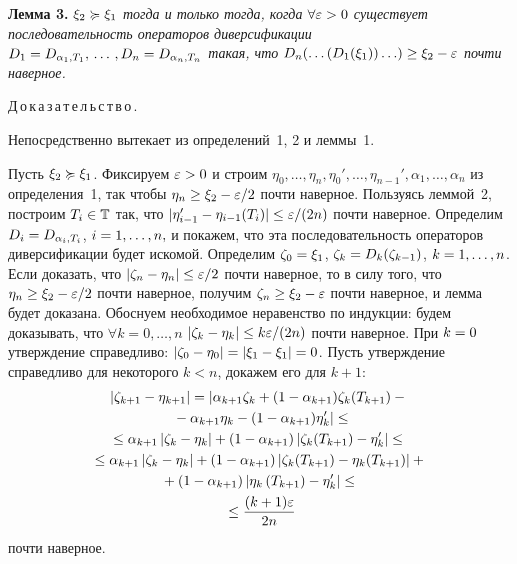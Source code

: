 \begin{multicols}{2}
\medskip

\noindent
\textbf{Лемма 3.} \textit{$\xi_2 \succcurlyeq \xi_1$ тогда и только тогда, когда $
\forall \eps\hm>0 $ существует последовательность операторов
диверсификации $ D_1=D_{\alpha_1,T_1},\, \ldots\, ,
D_n\hm=D_{\alpha_n,T_n} $ такая, что $ D_n(\ldots(D_1(\xi_1))\ldots)
\ge \xi_2 \hm- \eps $ почти наверное.}

\medskip

\noindent
Д\,о\,к\,а\,з\,а\,т\,е\,л\,ь\,с\,т\,в\,о\,.\

\noindent
\fbox{$\Leftarrow$} Непосредственно вытекает из определений~1, 2 и леммы~1.

\noindent
\fbox{$\Rightarrow$} Пусть $\xi_2 \succcurlyeq \xi_1$. Фиксируем $\eps
\hm> 0$ и строим $\eta_0, \ldots , \eta_n, \eta_0', \ldots,
\eta_{n-1}', \alpha_1, \ldots, \alpha_n$ из определения~1, так чтобы
$ \eta_n \hm\ge \xi_2 \hm- \eps/2 $ почти наверное. Пользуясь
леммой~2, построим $ T_i \hm\in \classT $ так, что $ | \eta_{i-1}' \hm-
\eta_{i-1}(T_i) | \hm\le \eps/(2n) $ почти наверное. Определим
$D_i \hm= D_{\alpha_i,T_i}$, $i \hm=1,\ldots,n,$ и покажем, что эта
последовательность операторов диверсификации будет искомой.
Определим $\zeta_0 \hm= \xi_1$, $\zeta_k \hm= D_k(\zeta_{k-1})$, $k \hm=
1,\ldots,n$. Если доказать, что $ | \zeta_n \hm- \eta_n | \hm\le
\eps/2$ почти наверное, то в силу того, что $ \eta_n \hm\ge
\xi_2 \hm- \eps/2 $ почти наверное, получим $ \zeta_n \hm\ge \xi_2
\hm- \eps $ почти наверное, и лемма будет доказана. Обоснуем
необходимое неравенство по индукции: будем доказывать, что $\forall
k=0,\dots,n$ $| \zeta_k \hm- \eta_k | \hm\le k \eps/(2n)$ почти
наверное. При $k\hm=0$ утверждение справедливо: $|\zeta_0 \hm- \eta_0| \hm=
|\xi_1 \hm- \xi_1| \hm= 0 $. Пусть утверждение справедливо для некоторого
$k<n$, докажем его для $k+1$:
\begin{multline*}
\left\vert \zeta_{k+1} - \eta_{k+1} \right\vert = 
\left\vert\alpha_{k+1}\zeta_k + (1-\alpha_{k+1})\zeta_k(T_{k+1}) -{}\right.\\
\left.{}-  \alpha_{k+1}\eta_k -                  (1-\alpha_{k+1})\eta_k' \right\vert \le \\
\le \alpha_{k+1} \left\vert \zeta_k - \eta_k \right\vert 
+ \left(1-\alpha_{k+1}\right) \left\vert\zeta_k(T_{k+1}) - \eta_k'\right\vert \le {}\\
\!{}\le \alpha_{k+1} \left| \zeta_k - \eta_k \right| + \left(1-\alpha_{k+1}\right) 
\left\vert\zeta_k(T_{k+1}) - \eta_k(T_{k+1})\right\vert +{}\\
{}+    \left(1-\alpha_{k+1}\right) \left\vert\eta_k\left(T_{k+1}\right) - \eta_k'\right\vert \le{} \\
{}\le \displaystyle\frac{\displaystyle (k+1)\varepsilon\mathstrut}{\displaystyle 2n\mathstrut} 
\end{multline*}
почти наверное.


\end{multicols}
